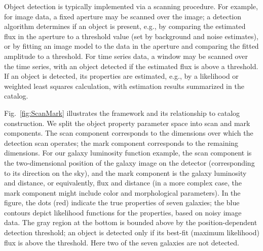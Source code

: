 Object detection is typically implemented via a scanning procedure.
For example, for image data, a fixed aperture may be scanned over the image; a detection algorithm determines if an object is present, e.g., by comparing the estimated flux in the aperture to a threshold value (set by background and noise estimates), or by fitting an image model to the data in the aperture and comparing the fitted amplitude to a threshold.
For time series data, a window may be scanned over the time series, with an object detected if the estimated flux is above a threshold.
If an object is detected, its properties are estimated, e.g., by a likelihood or weighted least squares calculation, with estimation results summarized in the catalog.

Fig.~\ref{fig:ScanMark} illustrates the framework and its relationship to catalog construction.
We split the object property parameter space into scan and mark components.
The scan component corresponds to the dimensions over which the detection scan operates; 
the mark component corresponds to the remaining dimensions.
For our galaxy luminosity function example, the scan component is the two-dimensional position of the galaxy image on the detector (corresponding to its direction on the sky), and the mark component is the galaxy luminosity and distance, or equivalently, flux and distance (in a more complex case, the mark component might include color and morphological parameters).
In the figure, the dots (red) indicate the true properties of seven galaxies; the blue contours depict likelihood functions for the properties, based on noisy image data.
The gray region at the bottom is bounded above by the position-dependent detection threshold; an object is detected only if its best-fit (maximum likelihood) flux is above the threshold.
Here two of the seven galaxies are not detected.

